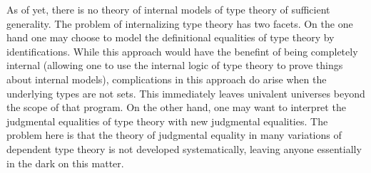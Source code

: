 As of yet, there is no theory of internal models of type theory of sufficient
generality. The problem of internalizing type theory has two facets. On the one
hand one may choose to model the definitional equalities of type theory by
identifications. While this approach would have the benefint of being completely
internal (allowing one to use the internal logic of type theory to prove things
about internal models), complications in this approach do arise when the 
underlying types are not sets. This immediately leaves univalent universes beyond
the scope of that program. On the other hand, one may want to interpret the
judgmental equalities of type theory with new judgmental equalities. The problem
here is that the theory of judgmental equality in many variations of dependent
type theory is not developed systematically, leaving anyone essentially in the
dark on this matter.
